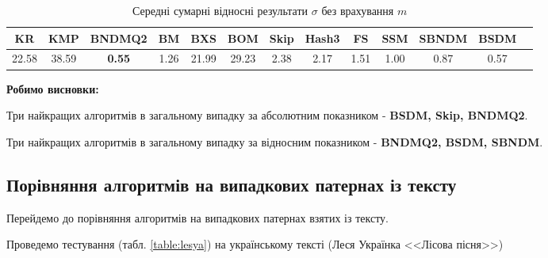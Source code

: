 \documentclass[a4paper,14pt]{extarticle} %
\begin{document}
					\begin{table}[H]
						\centering
						\scriptsize
						\begin{tabular}{|c|c|c|c|c|c|c|c|c|c|c|c|c|}
						\hline
						\textbf{KR} & \textbf{KMP} & \textbf{BNDMQ2} & \textbf{BM} & \textbf{BXS} & \textbf{BOM} & \textbf{Skip} & \textbf{Hash3} & \textbf{FS} & \textbf{SSM} & \textbf{SBNDM} & \textbf{BSDM} \\
						\hline
						22.58 & 38.59 & \textbf{0.55} & 1.26 & 21.99 & 29.23 & 2.38 & 2.17 & 1.51 & 1.00 & 0.87 & 0.57 \\
						\hline
						\end{tabular}
						\caption{Середні сумарні відносні результати $\sigma$ без врахування $m$}
						\label{table:final_relative_fullrandom}
					\end{table}
						
					\textbf{Робимо висновки:}

					Три найкращих алгоритмів в загальному випадку за абсолютним показником - \textbf{BSDM, Skip, BNDMQ2}.

					Три найкращих алгоритмів в загальному випадку за відносним показником - \textbf{BNDMQ2, BSDM, SBNDM}.

				\subsection{Порівняння алгоритмів на випадкових патернах із тексту }

				Перейдемо до порівняння алгоритмів на випадкових патернах взятих із тексту.

				Проведемо тестування (табл. \ref{table:lesya}) на українському тексті (Леся Українка <<Лісова пісня>>)
				
\end{document}
